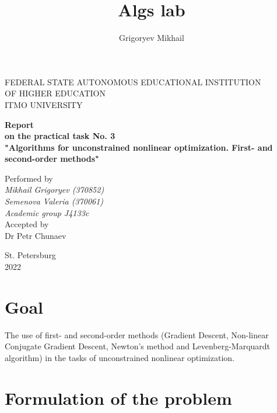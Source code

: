 \documentclass[12pt, a4paper]{article}
\author{Grigoryev Mikhail}
\title{Algs lab}
\begin{document}
\thispagestyle{empty}

\vspace{30mm}

\begin{center}
FEDERAL STATE AUTONOMOUS EDUCATIONAL INSTITUTION \\
OF HIGHER EDUCATION \\
ITMO UNIVERSITY

\vspace{40mm}

{\large \textbf{Report \\
on the practical task No. 3 \\
"Algorithms for unconstrained nonlinear optimization. First- and second-order methods"}}
\end{center}

\vspace{15mm}

\begin{flushright}
{\large Performed by \\
\textit{Mikhail Grigoryev (370852) \\
Semenova Valeria (370061) \\
Academic group J4133c \\}
Accepted by \\
Dr Petr Chunaev}
\end{flushright}

\vspace{80mm}

\begin{center}
St. Petersburg \\
2022
\end{center}

\newpage

\section*{Goal}

The use of first- and second-order methods (Gradient Descent, Non-linear Conjugate Gradient Descent, Newton's method and Levenberg-Marquardt algorithm) in the tasks of unconstrained nonlinear optimization.

\section*{Formulation of the problem}
\end{document}
